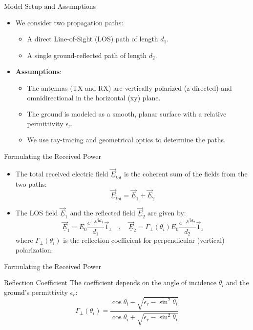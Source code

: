 \documentclass{beamer}
\begin{document}
	\begin{frame}{Model Setup and Assumptions}
		\begin{itemize}
			\item We consider two propagation paths:
			\begin{itemize}
				\item A direct Line-of-Sight (LOS) path of length $d_1$.
				\item A single ground-reflected path of length $d_2$.
			\end{itemize}
			\item \textbf{Assumptions}:
			\begin{itemize}
				\item The antennas (TX and RX) are vertically polarized (z-directed) and omnidirectional in the horizontal (xy) plane.
				\item The ground is modeled as a smooth, planar surface with a relative permittivity $\epsilon_r$.
				\item We use ray-tracing and geometrical optics to determine the paths.
			\end{itemize}
		\end{itemize}
	\end{frame}
	
	\begin{frame}{Formulating the Received Power}
		\begin{itemize}
			\item The total received electric field $\underline{\vec{E}}_{tot}$ is the coherent sum of the fields from the two paths:
			\[ \underline{\vec{E}}_{tot} = \underline{\vec{E}}_{1} + \underline{\vec{E}}_{2} \]
			\item The LOS field $\underline{\vec{E}}_{1}$ and the reflected field $\underline{\vec{E}}_{2}$ are given by:
			\[ \underline{\vec{E}}_{1} = E_0 \frac{e^{-j\beta d_1}}{d_1} \vec{1}_z \quad , \quad \underline{\vec{E}}_{2} = \Gamma_{\perp}(\theta_i) E_0 \frac{e^{-j\beta d_2}}{d_2} \vec{1}_z \]
			where $\Gamma_{\perp}(\theta_i)$ is the reflection coefficient for perpendicular (vertical) polarization.
		\end{itemize}
	\end{frame}
	
	\begin{frame}{Formulating the Received Power}
		\begin{block}{Reflection Coefficient}
			The coefficient depends on the angle of incidence $\theta_i$ and the ground's permittivity $\epsilon_r$:
			\[ \Gamma_{\perp}(\theta_i) = \frac{\cos\theta_i - \sqrt{\epsilon_r - \sin^2\theta_i}}{\cos\theta_i + \sqrt{\epsilon_r - \sin^2\theta_i}} \]
		\end{block}
	\end{frame}
	
\end{document}
